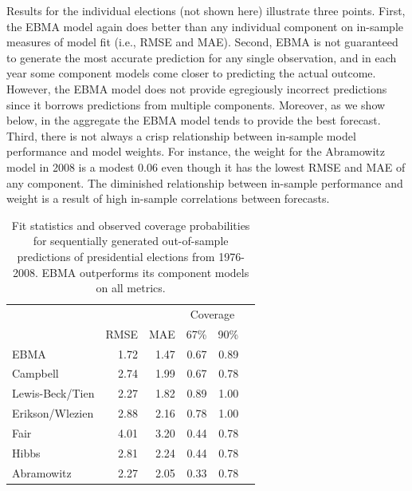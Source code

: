 \documentclass[pdftex,12pt,fullpage,oneside]{amsart}
\begin{document}
Results for the individual elections (not shown here) illustrate three
points.  First, the EBMA model again does better than any individual
component on in-sample measures of model fit (i.e., RMSE and MAE).
Second, EBMA is not guaranteed to generate the most accurate
prediction for any single observation, and in each year some component
models come closer to predicting the actual outcome.  However, the
EBMA model does not provide egregiously incorrect predictions since it
borrows predictions from multiple components.  Moreover, as we show
below, in the aggregate the EBMA model tends to provide the best
forecast.  Third, there is not always a crisp relationship between
in-sample model performance and model weights.  For instance, the
weight for the Abramowitz model in 2008 is a modest 0.06 even though
it has the lowest RMSE and MAE of any component.  The diminished
relationship between in-sample performance and weight is a result of
high in-sample correlations between forecasts.  %


\begin{table}
\vspace{-10pt}
  \caption{\footnotesize Fit statistics and observed coverage
    probabilities for sequentially generated out-of-sample predictions of
    presidential elections from 1976-2008.  EBMA outperforms its
    component models on all metrics.}
\label{Pres-Res} \small
\begin{center}
\begin{tabular}{lrrrrr}
\toprule
                        &              &              & \multicolumn{2}{c}{Coverage} \\ 
                    	&	RMSE&	MAE	&67\% &   90\%      \\
\midrule
EBMA	           &	1.72	&	1.47	&	0.67	&	0.89	\\
Campbell	           &	2.74	&	1.99	&	0.67	&	0.78	\\
Lewis-Beck/Tien&	2.27	&	1.82	&	0.89	&	1.00	\\
Erikson/Wlezien&	2.88	&	2.16	&	0.78	&	1.00	\\
Fair	                   &	4.01	&	3.20	&	0.44	&	0.78	\\
Hibbs	           &	2.81	&	2.24	&	0.44&      0.78 \\
Abramowitz	   &	2.27	&	2.05	&	0.33	&     0.78	\\

\bottomrule
\end{tabular}
\end{center}
\vspace{-10pt}
\end{table}
\end{document}
